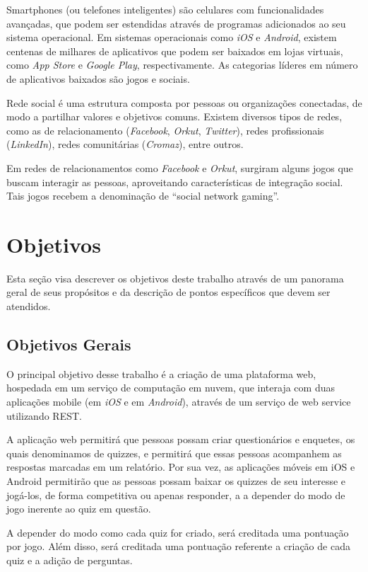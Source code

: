         Smartphones (ou telefones inteligentes) são celulares com funcionalidades avançadas, que podem ser estendidas através de programas adicionados ao seu sistema operacional.  Em sistemas operacionais como \emph{iOS} e \emph{Android}, existem centenas de milhares de aplicativos que podem ser baixados em lojas virtuais, como \emph{App Store} e \emph{Google Play}, respectivamente. As categorias líderes em número de aplicativos baixados são jogos e sociais.
		
        Rede social é uma estrutura composta por pessoas ou organizações conectadas, de modo a partilhar valores e objetivos comuns. Existem diversos tipos de redes, como as de relacionamento (\emph{Facebook}, \emph{Orkut}, \emph{Twitter}), redes profissionais (\emph{LinkedIn}), redes comunitárias (\emph{Cromaz}), entre outros.      
		
        Em redes de relacionamentos como \emph{Facebook} e \emph{Orkut}, surgiram alguns jogos que buscam interagir as pessoas, aproveitando características de integração social. Tais jogos recebem a denominação de ``social network gaming''.
\section{Objetivos}
 
	Esta seção visa descrever os objetivos deste trabalho através de um panorama geral de seus propósitos e da descrição de pontos específicos que devem ser atendidos.
 
\subsection{Objetivos Gerais}
 
        O principal objetivo desse trabalho é a criação de uma plataforma web, hospedada em um serviço de computação em nuvem, que interaja com duas aplicações mobile (em \emph{iOS} e em \emph{Android}), através de um serviço de web service utilizando \ac{REST}.
		
		A aplicação web permitirá que pessoas possam criar questionários e enquetes, os quais denominamos de quizzes, e permitirá que essas pessoas acompanhem as respostas marcadas em um relatório.  Por sua vez, as aplicações móveis em iOS e Android permitirão que as pessoas possam baixar os quizzes de seu interesse e jogá-los, de forma competitiva ou apenas responder, a a depender do modo de jogo inerente ao quiz em questão.	
			
		A depender do modo como cada quiz for criado, será creditada uma pontuação por jogo. Além disso, será creditada uma pontuação referente a criação de cada quiz e a adição de perguntas.
 
